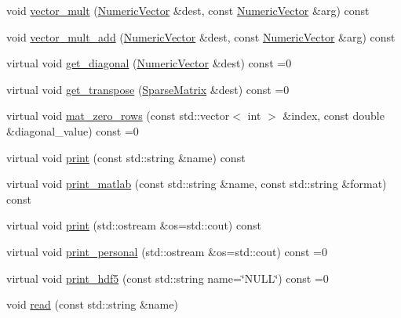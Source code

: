 \begin{DoxyCompactItemize}
\item 
void \mbox{\hyperlink{classfemus_1_1_sparse_matrix_a256b168e4290e8e6d953ff09865c0dc2}{vector\+\_\+mult}} (\mbox{\hyperlink{classfemus_1_1_numeric_vector}{Numeric\+Vector}} \&dest, const \mbox{\hyperlink{classfemus_1_1_numeric_vector}{Numeric\+Vector}} \&arg) const
\item 
void \mbox{\hyperlink{classfemus_1_1_sparse_matrix_a937151e966fae56064a7d501e3ef3afd}{vector\+\_\+mult\+\_\+add}} (\mbox{\hyperlink{classfemus_1_1_numeric_vector}{Numeric\+Vector}} \&dest, const \mbox{\hyperlink{classfemus_1_1_numeric_vector}{Numeric\+Vector}} \&arg) const
\item 
virtual void \mbox{\hyperlink{classfemus_1_1_sparse_matrix_a072c27c4a5fbc62bff458462a04af436}{get\+\_\+diagonal}} (\mbox{\hyperlink{classfemus_1_1_numeric_vector}{Numeric\+Vector}} \&dest) const =0
\item 
virtual void \mbox{\hyperlink{classfemus_1_1_sparse_matrix_a4a0027bb028b0b769a04e2889553d72a}{get\+\_\+transpose}} (\mbox{\hyperlink{classfemus_1_1_sparse_matrix}{Sparse\+Matrix}} \&dest) const =0
\item 
virtual void \mbox{\hyperlink{classfemus_1_1_sparse_matrix_a61829cf3f0a4640313a87646cd9c54e6}{mat\+\_\+zero\+\_\+rows}} (const std\+::vector$<$ int $>$ \&index, const double \&diagonal\+\_\+value) const =0
\item 
virtual void \mbox{\hyperlink{classfemus_1_1_sparse_matrix_a9da15e6e7981104079c771163aa23f8d}{print}} (const std\+::string \&name) const
\item 
virtual void \mbox{\hyperlink{classfemus_1_1_sparse_matrix_a8267f33f7633b2a7050ca28d48e8be11}{print\+\_\+matlab}} (const std\+::string \&name, const std\+::string \&format) const
\item 
virtual void \mbox{\hyperlink{classfemus_1_1_sparse_matrix_a27729b95c9515c59a7f71187a4871559}{print}} (std\+::ostream \&os=std\+::cout) const
\item 
virtual void \mbox{\hyperlink{classfemus_1_1_sparse_matrix_a6ce1f4c72f660467a2dee9293c8808ac}{print\+\_\+personal}} (std\+::ostream \&os=std\+::cout) const =0
\item 
virtual void \mbox{\hyperlink{classfemus_1_1_sparse_matrix_a8e74c550fcce774ccb664b7b74aaff68}{print\+\_\+hdf5}} (const std\+::string name=\char`\"{}N\+U\+LL\char`\"{}) const =0
\item 
void \mbox{\hyperlink{classfemus_1_1_sparse_matrix_a93ef51c0dc6cbbe2aa62e1256749d7c6}{read}} (const std\+::string \&name)
\item 

\end{DoxyCompactItemize}
